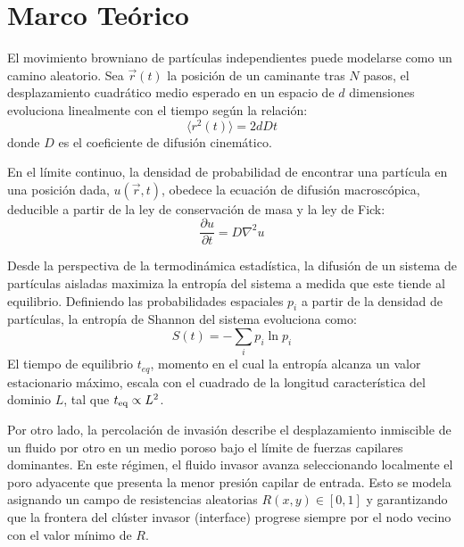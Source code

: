 \section{Marco Teórico}

El movimiento browniano de partículas independientes puede modelarse como un camino aleatorio. Sea $\vec{r}(t)$ la posición de un caminante tras $N$ pasos, el desplazamiento cuadrático medio esperado en un espacio de $d$ dimensiones evoluciona linealmente con el tiempo según la relación:
\begin{equation}
\label{eq:r2}
\langle r^2(t) \rangle = 2dDt
\end{equation}
donde $D$ es el coeficiente de difusión cinemático. 

En el límite continuo, la densidad de probabilidad de encontrar una partícula en una posición dada, $u(\vec{r}, t)$, obedece la ecuación de difusión macroscópica, deducible a partir de la ley de conservación de masa y la ley de Fick:
\begin{equation}
\frac{\partial u}{\partial t} = D \nabla^2 u
\end{equation}

Desde la perspectiva de la termodinámica estadística, la difusión de un sistema de partículas aisladas maximiza la entropía del sistema a medida que este tiende al equilibrio. Definiendo las probabilidades espaciales $p_i$ a partir de la densidad de partículas, la entropía de Shannon del sistema evoluciona como:
\begin{equation}
S(t) = - \sum_i p_i \ln p_i
\end{equation}
El tiempo de equilibrio $t_{eq}$, momento en el cual la entropía alcanza un valor estacionario máximo, escala con el cuadrado de la longitud característica del dominio $L$, tal que $t_{\rm eq} \propto L^2$.

Por otro lado, la percolación de invasión describe el desplazamiento inmiscible de un fluido por otro en un medio poroso bajo el límite de fuerzas capilares dominantes. En este régimen, el fluido invasor avanza seleccionando localmente el poro adyacente que presenta la menor presión capilar de entrada. Esto se modela asignando un campo de resistencias aleatorias $R(x,y) \in [0,1]$ y garantizando que la frontera del clúster invasor (interface) progrese siempre por el nodo vecino con el valor mínimo de $R$.
